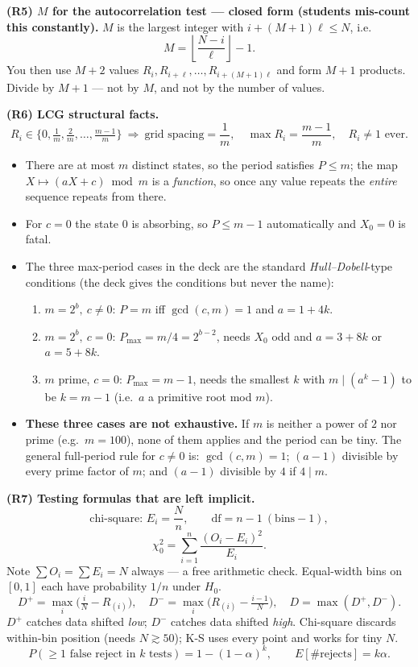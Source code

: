 \begin{derivedbox}
\smallskip
\textbf{(R5) $M$ for the autocorrelation test --- closed form (students mis-count this constantly).} $M$ is the largest integer with $i+(M+1)\ell\le N$, i.e.
\[
M = \left\lfloor \frac{N-i}{\ell} \right\rfloor - 1 .
\]
You then use $M+2$ values $R_i,R_{i+\ell},\dots,R_{i+(M+1)\ell}$ and form $M+1$ products. Divide by $M+1$ --- not by $M$, and not by the number of values.

\smallskip
\textbf{(R6) LCG structural facts.}
\[
R_i \in \Big\{0,\tfrac1m,\tfrac2m,\dots,\tfrac{m-1}{m}\Big\}
\ \Rightarrow\ \text{grid spacing} = \frac1m,\quad \max R_i = \frac{m-1}{m},\quad R_i \ne 1 \text{ ever}.
\]
\begin{itemize}
\item There are at most $m$ distinct states, so the period satisfies $P\le m$; the map $X\mapsto(aX+c)\bmod m$ is a \emph{function}, so once any value repeats the \emph{entire} sequence repeats from there.
\item For $c=0$ the state $0$ is absorbing, so $P\le m-1$ automatically and $X_0=0$ is fatal.
\item The three max-period cases in the deck are the standard \emph{Hull--Dobell}-type conditions (the deck gives the conditions but never the name):
  \begin{enumerate}[label=(\alph*)]
  \item $m=2^b,\ c\ne0$: $P=m$ iff $\gcd(c,m)=1$ and $a=1+4k$.
  \item $m=2^b,\ c=0$: $P_{\max}=m/4=2^{b-2}$, needs $X_0$ odd and $a=3+8k$ or $a=5+8k$.
  \item $m$ prime, $c=0$: $P_{\max}=m-1$, needs the smallest $k$ with $m\mid(a^k-1)$ to be $k=m-1$ (i.e.\ $a$ a primitive root mod $m$).
  \end{enumerate}
\item \textbf{These three cases are not exhaustive.} If $m$ is neither a power of $2$ nor prime (e.g.\ $m=100$), none of them applies and the period can be tiny. The general full-period rule for $c\ne0$ is: $\gcd(c,m)=1$; $(a-1)$ divisible by every prime factor of $m$; and $(a-1)$ divisible by $4$ if $4\mid m$.
\end{itemize}

\smallskip
\textbf{(R7) Testing formulas that are left implicit.}
\[
\text{chi-square: } E_i = \frac{N}{n}, \qquad \mathrm{df} = n-1 \ (\text{bins} - 1),
\]
\[
\chi_0^2 = \sum_{i=1}^n \frac{(O_i-E_i)^2}{E_i}.
\]
Note $\sum O_i = \sum E_i = N$ always --- a free arithmetic check. Equal-width bins on $[0,1]$ each have probability $1/n$ under $H_0$.
\[
D^+=\max_i\Big(\tfrac{i}{N}-R_{(i)}\Big),\quad D^-=\max_i\Big(R_{(i)}-\tfrac{i-1}{N}\Big),\quad D=\max(D^+,D^-).
\]
$D^+$ catches data shifted \emph{low}; $D^-$ catches data shifted \emph{high}. Chi-square discards within-bin position (needs $N\gtrsim50$); K-S uses every point and works for tiny $N$.
\[
P(\ge 1 \text{ false reject in } k \text{ tests}) = 1-(1-\alpha)^k, \qquad E[\#\text{rejects}] = k\alpha .
\]


\end{derivedbox}
